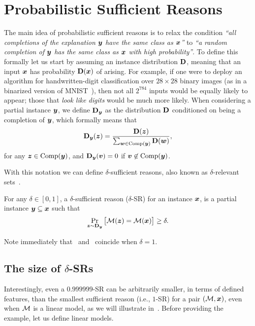 \section{Probabilistic Sufficient Reasons}

The main idea of probabilistic sufficient reasons is to relax the condition \emph{``all completions of the explanation ${\bm{y}}$ have the same class as ${\bm{x}}$''} to \emph{``a random completion of ${\bm{y}}$ has the same class as ${\bm{x}}$ with high probability''}. To define this formally let us start by assuming an instance distribution $\mathbf{D}$, meaning that an input ${\bm{x}}$ has probability $\mathbf{D}({\bm{x}})$ of arising. For example, if one were to deploy an algorithm for handwritten-digit classification over $28 \times 28$ binary images (as in a binarized version of MNIST~\cite{deng2012mnist}), then not all $2^{784}$ inputs would be equally likely to appear; those that \emph{look like digits} would be much more likely.
When considering a partial instance ${\bm{y}}$, we define $\mathbf{D}_{{\bm{y}}}$ as the distribution $\mathbf{D}$ conditioned on being a completion of ${\bm{y}}$, which formally means that 
\[
	\mathbf{D}_{{\bm{y}}}({\bm{z}}) = \frac{\mathbf{D}({\bm{z}})}{\sum_{{\bm{w}} \in \operatorname{Comp}({\bm{y}})} \mathbf{D}({\bm{w}})},
\]
for any ${\bm{z}} \in \operatorname{Comp}({\bm{y}})$, and $\mathbf{D}_{{\bm{y}}}({\bm{v}}) = 0$ if ${\bm{v}} \not\in \operatorname{Comp}({\bm{y}})$.
 
With this notation we can define $\delta$-sufficient reasons, also known as $\delta$-relevant sets~\cite{Izza2021EfficientEW}.
\begin{definition}
	For any $\delta \in [0, 1]$, a $\delta$-sufficient reason ($\delta$-SR) for an instance ${\bm{x}}$, is a partial instance ${\bm{y}} \subseteq {\bm{x}}$ such that
	\[
		\Pr_{{\bm{z}} \sim \mathbf{D}_{{\bm{y}}}}\big[\mathcal{M}({\bm{z}}) = \mathcal{M}({\bm{x}})\big] \geq \delta.
	\]
	\label{def:delta-SR}
\end{definition}
%
Note immediately that~ and~ coincide when $\delta = 1$.
\subsection{The size of $\delta$-SRs}

Interestingly, even a $0.999999$-SR can be arbitrarily smaller, in terms of defined features, than the smallest sufficient reason (i.e., $1$-SR) for a pair $(\mathcal{M}, {\bm{x}})$, even when $\mathcal{M}$ is a linear model, as we will illustrate in~. Before providing the example, let us define linear models.

